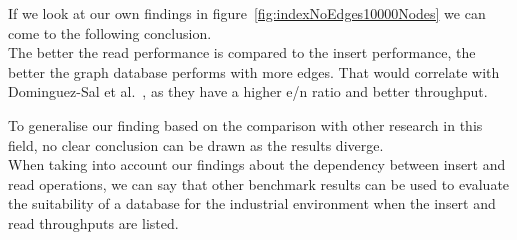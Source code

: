If we look at our own findings in figure~\ref{fig:indexNoEdges10000Nodes} we can come to the following conclusion.\\
The better the read performance is compared to the insert performance, the better the graph database performs with more edges.
That would correlate with Dominguez-Sal et al.~\cite{TaoShen},
as they have a higher e/n ratio and better throughput.

To generalise our finding based on the comparison with other research in this field,
no clear conclusion can be drawn as the results diverge.\\
When taking into account our findings about the dependency between insert and read operations,
we can say that other benchmark results can be used to evaluate the suitability of a database for the industrial environment when the insert and read throughputs are listed.
